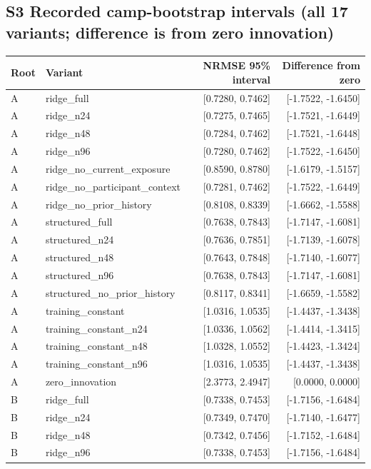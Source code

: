 \documentclass[9pt,a4paper]{extarticle}
\begin{document}
\subsection*{S3 Recorded camp-bootstrap intervals (all 17 variants; difference is from zero innovation)}\small
\begin{longtable}{llrr}
\toprule
Root & Variant & NRMSE 95\% interval & Difference from zero \\
\midrule
\endhead
A & ridge\_full & [0.7280, 0.7462] & [-1.7522, -1.6450] \\
A & ridge\_n24 & [0.7275, 0.7465] & [-1.7521, -1.6449] \\
A & ridge\_n48 & [0.7284, 0.7462] & [-1.7521, -1.6448] \\
A & ridge\_n96 & [0.7280, 0.7462] & [-1.7522, -1.6450] \\
A & ridge\_no\_current\_exposure & [0.8590, 0.8780] & [-1.6179, -1.5157] \\
A & ridge\_no\_participant\_context & [0.7281, 0.7462] & [-1.7522, -1.6449] \\
A & ridge\_no\_prior\_history & [0.8108, 0.8339] & [-1.6662, -1.5588] \\
A & structured\_full & [0.7638, 0.7843] & [-1.7147, -1.6081] \\
A & structured\_n24 & [0.7636, 0.7851] & [-1.7139, -1.6078] \\
A & structured\_n48 & [0.7643, 0.7848] & [-1.7140, -1.6077] \\
A & structured\_n96 & [0.7638, 0.7843] & [-1.7147, -1.6081] \\
A & structured\_no\_prior\_history & [0.8117, 0.8341] & [-1.6659, -1.5582] \\
A & training\_constant & [1.0316, 1.0535] & [-1.4437, -1.3438] \\
A & training\_constant\_n24 & [1.0336, 1.0562] & [-1.4414, -1.3415] \\
A & training\_constant\_n48 & [1.0328, 1.0552] & [-1.4423, -1.3424] \\
A & training\_constant\_n96 & [1.0316, 1.0535] & [-1.4437, -1.3438] \\
A & zero\_innovation & [2.3773, 2.4947] & [0.0000, 0.0000] \\
B & ridge\_full & [0.7338, 0.7453] & [-1.7156, -1.6484] \\
B & ridge\_n24 & [0.7349, 0.7470] & [-1.7140, -1.6477] \\
B & ridge\_n48 & [0.7342, 0.7456] & [-1.7152, -1.6484] \\
B & ridge\_n96 & [0.7338, 0.7453] & [-1.7156, -1.6484] \\

\end{longtable}
\end{document}
